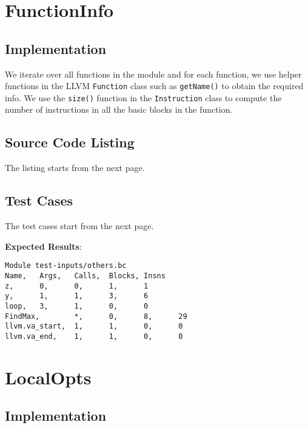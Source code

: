 \section{FunctionInfo}

\subsection{Implementation}

We iterate over all functions in the module and for each function, we use helper functions in the
LLVM \texttt{Function} class such as \texttt{getName()} to obtain the required info.
We use the \texttt{size()} function in the \texttt{Instruction} class to compute the number of
instructions in all the basic blocks in the function.

\subsection{Source Code Listing}

The listing starts from the next page.



\subsection{Test Cases}

The test cases start from the next page.



\textbf{Expected Results}:\\

\begin{verbatim}
Module test-inputs/others.bc
Name,   Args,   Calls,  Blocks, Insns
z,      0,      0,      1,      1
y,      1,      1,      3,      6
loop,   3,      1,      0,      0
FindMax,        *,      0,      8,      29
llvm.va_start,  1,      1,      0,      0
llvm.va_end,    1,      1,      0,      0
\end{verbatim}

\section{LocalOpts}

\subsection{Implementation}


